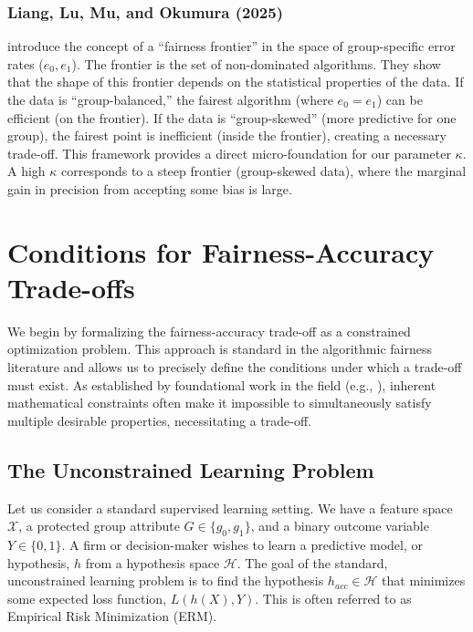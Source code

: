 \documentclass[12pt,a4paper]{article}
\theoremstyle{definition}
\theoremstyle{remark}
\begin{document}
\subsubsection{Liang, Lu, Mu, and Okumura (2025)}

\citet{Liang2025} introduce the concept of a ``fairness frontier'' in the space of group-specific error rates ($e_0, e_1$). The frontier is the set of non-dominated algorithms. They show that the shape of this frontier depends on the statistical properties of the data. If the data is ``group-balanced,'' the fairest algorithm (where $e_0 = e_1$) can be efficient (on the frontier). If the data is ``group-skewed'' (more predictive for one group), the fairest point is inefficient (inside the frontier), creating a necessary trade-off. This framework provides a direct micro-foundation for our parameter $\kappa$. A high $\kappa$ corresponds to a steep frontier (group-skewed data), where the marginal gain in precision from accepting some bias is large.


\section{Conditions for Fairness-Accuracy Trade-offs}

We begin by formalizing the fairness-accuracy trade-off as a constrained optimization problem. This approach is standard in the algorithmic fairness literature and allows us to precisely define the conditions under which a trade-off must exist. As established by foundational work in the field (e.g., \citealp{Kleinberg2017, Chouldechova2017}), inherent mathematical constraints often make it impossible to simultaneously satisfy multiple desirable properties, necessitating a trade-off.

\subsection{The Unconstrained Learning Problem}

Let us consider a standard supervised learning setting. We have a feature space $\mathcal{X}$, a protected group attribute $G \in \{g_0, g_1\}$, and a binary outcome variable $Y \in \{0, 1\}$. A firm or decision-maker wishes to learn a predictive model, or hypothesis, $h$ from a hypothesis space $\mathcal{H}$. The goal of the standard, unconstrained learning problem is to find the hypothesis $h_{acc} \in \mathcal{H}$ that minimizes some expected loss function, $L(h(X), Y)$. This is often referred to as Empirical Risk Minimization (ERM).
\end{document}
